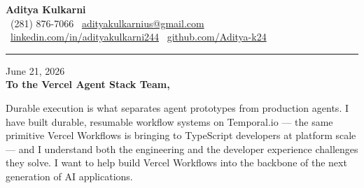 \documentclass[11pt,letterpaper]{article}
\begin{document}
\begin{center}
    {\Huge \textbf{\color{VercelBlack} Aditya Kulkarni}}\\[8pt]
    {\color{DarkGrey} \small
    \faPhone \ (281) 876-7066 \quad \textbar \quad
    \faEnvelope \ \href{mailto:adityakulkarnius@gmail.com}{adityakulkarnius@gmail.com} \\[4pt]
    \faLinkedin \ \href{https://linkedin.com/in/adityakulkarni244}{linkedin.com/in/adityakulkarni244} \quad \textbar \quad
    \faGithub \ \href{https://github.com/Aditya-k24}{github.com/Aditya-k24}
    }
\end{center}
\vspace{-4pt}
{\color{VercelBlack}\rule{\linewidth}{1.5pt}}
\vspace{10pt}

June 21, 2026\\[10pt]
\textbf{To the Vercel Agent Stack Team,}

\vspace{6pt}

Durable execution is what separates agent prototypes from production agents. I have built durable, resumable workflow systems on Temporal.io --- the same primitive Vercel Workflows is bringing to TypeScript developers at platform scale --- and I understand both the engineering and the developer experience challenges they solve. I want to help build Vercel Workflows into the backbone of the next generation of AI applications.
\end{document}
